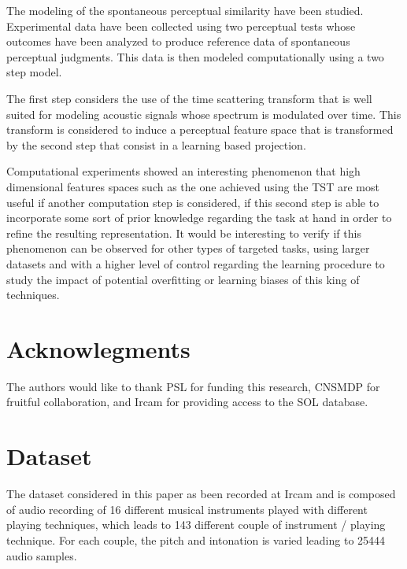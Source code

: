 \documentclass{article}
\begin{document}
The modeling of the spontaneous perceptual similarity have been studied. Experimental data have been collected using two perceptual tests whose outcomes have been analyzed to produce reference data of spontaneous perceptual judgments. This data is then modeled computationally using a two step model.

The first step considers the use of the time scattering transform that is well suited for modeling acoustic signals whose spectrum is modulated over time. This transform is considered to induce a perceptual feature space that is transformed by the second step that consist in a learning based projection.

Computational experiments showed an interesting phenomenon that high dimensional features spaces such as the one achieved using the TST are most useful if another computation step is considered, if this second step is able to incorporate some sort of prior knowledge regarding the task at hand in order to refine the resulting representation. It would be interesting to verify if this phenomenon can be observed for other types of targeted tasks, using larger datasets and with a higher level of control regarding the learning procedure to study the impact of potential overfitting or learning biases of this king of techniques.


\section*{Acknowlegments}

The authors would like to thank
PSL for funding this research,
CNSMDP for fruitful collaboration,
and Ircam for providing access to the SOL database.






\section{Dataset} \label{sec:dataset}

The dataset considered in this paper as been recorded at Ircam and is composed of audio recording of 16 different musical instruments played with different playing techniques, which leads to 143 different couple of instrument / playing technique. For each couple, the pitch and intonation is varied leading to 25444 audio samples.
\end{document}
